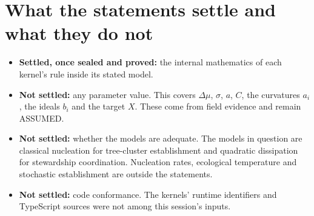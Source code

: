 \documentclass[11pt]{article}
\theoremstyle{definition}
\theoremstyle{remark}
\begin{document}
\section{What the statements settle and what they do not}
\begin{itemize}
\item \textbf{Settled, once sealed and proved:} the internal mathematics of each kernel's rule inside its stated model.
\item \textbf{Not settled:} any parameter value. This covers $\Delta\mu$, $\sigma$, $a$, $C$, the curvatures $a_i$, the ideals $b_i$ and the target $X$.
These come from field evidence and remain ASSUMED.
\item \textbf{Not settled:} whether the models are adequate. The models in question are classical nucleation for tree-cluster establishment and
quadratic dissipation for stewardship coordination. Nucleation rates, ecological temperature and stochastic establishment are outside the statements.
\item \textbf{Not settled:} code conformance. The kernels' runtime identifiers and TypeScript sources were not among this session's inputs.
\end{itemize}
\end{document}
